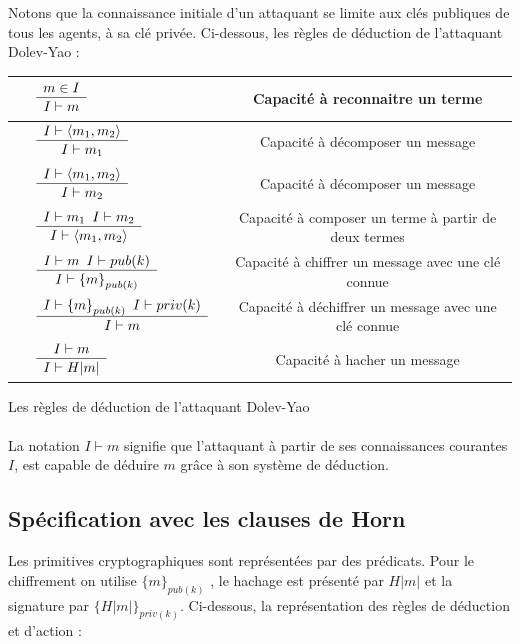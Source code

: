 \documentclass[10pt,a4paper]{article}
\newcommand{\VERT}[1]{{\color{green}#1}}
\newcommand{\bl}[1]{\textcolor{black}{#1}}
\newcommand{\inferLabel}[3]{\bl{
    \begin{array}{cc}
    {\VERT{#1}} \quad
    \begin{array}{c}
      #2\\
      \hline \noalign{\vskip 1pt}#3
    \end{array}
  \end{array}
  }}
\begin{document}
Notons que la connaissance initiale d’un attaquant se limite aux clés publiques de tous les agents, à sa clé privée. Ci-dessous, les règles de déduction de l'attaquant Dolev-Yao :\newline
\begin{center}
\begin{tabular}{|l|c|}
  \hline
  $\inferLabel{}{ m \in I}{I\vdash m}$ & Capacité à reconnaitre un terme \\
  \hline
  $\inferLabel{}{ I \vdash \langle m_{1},m_{2} \rangle}{I\vdash m_{1}}$ & Capacité à décomposer un message  \\
  \hline
  $\inferLabel{}{ I \vdash \langle m_{1},m_{2} \rangle}{I\vdash m_{2}}$ & Capacité à décomposer un message \\
  \hline
  $\inferLabel{}{ I \vdash m_{1} \hspace{5pt} I \vdash m_{2} }{I \vdash \langle m_{1},m_{2} \rangle}$ & Capacité  à  composer  un  terme  à  partir  de  deux termes \\
  \hline
  $\inferLabel{}{ I \vdash m \hspace{5pt} I \vdash pub(k) }{I \vdash {\lbrace m \rbrace}_{pub(k)}}$ & Capacité  à  chiffrer  un  message  avec  une  clé connue \\
  \hline
  $\inferLabel{}{ I \vdash {\lbrace m \rbrace}_{pub(k)} \hspace{5pt} I \vdash priv(k) }{I \vdash m}$ & Capacité  à  déchiffrer  un  message  avec  une  clé connue \\
  \hline
    $\inferLabel{}{ I \vdash m }{I \vdash H|m|}$ & Capacité  à  hacher un message \\
  \hline
\end{tabular}
\caption{Les règles de déduction de l'attaquant Dolev-Yao}
\end{center}
\medskip

\paragraph{}
La notation $I \vdash m$ signifie que l’attaquant à partir de ses connaissances courantes $I$,
est capable de déduire $m$ grâce à son système de déduction.

\subsection{Spécification avec les clauses de Horn}
Les primitives cryptographiques sont représentées par des prédicats. Pour le chiffrement on utilise ${\lbrace m\rbrace}_{pub(k)}$ , le hachage est présenté par $H|m|$ et la signature par ${\lbrace H|m|\rbrace}_{priv(k)}$. Ci-dessous, la représentation des règles de déduction et d'action :\newline
\end{document}
